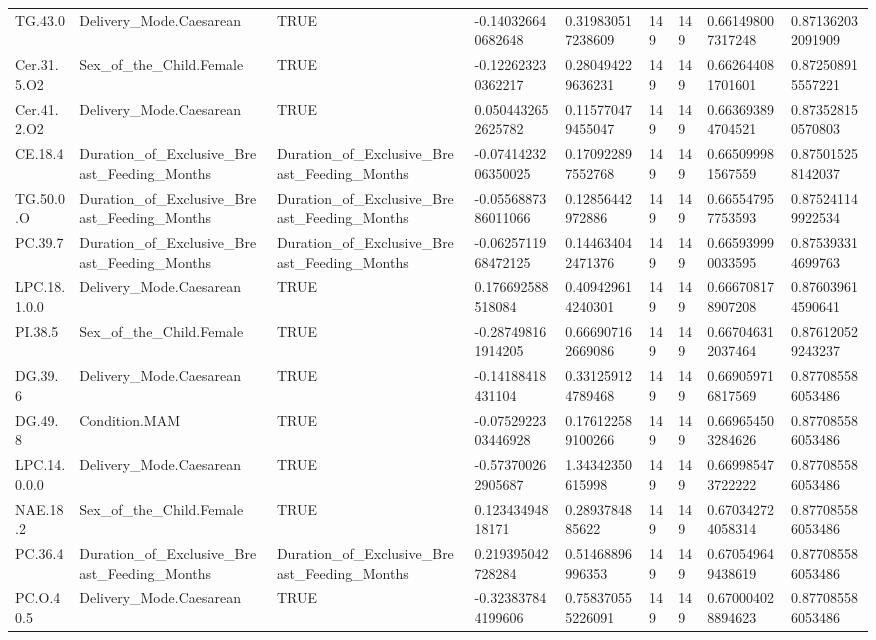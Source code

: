 \begin{longtable}{lllllllll}
TG.43.0 & Delivery\_Mode.Caesarean & TRUE & -0.140326640682648 & 0.319830517238609 & 149 & 149 & 0.661498007317248 & 0.871362032091909 \\
Cer.31.5.O2 & Sex\_of\_the\_Child.Female & TRUE & -0.122623230362217 & 0.280494229636231 & 149 & 149 & 0.662644081701601 & 0.872508915557221 \\
Cer.41.2.O2 & Delivery\_Mode.Caesarean & TRUE & 0.0504432652625782 & 0.115770479455047 & 149 & 149 & 0.663693894704521 & 0.873528150570803 \\
CE.18.4 & Duration\_of\_Exclusive\_Breast\_Feeding\_Months & Duration\_of\_Exclusive\_Breast\_Feeding\_Months & -0.0741423206350025 & 0.170922897552768 & 149 & 149 & 0.665099981567559 & 0.875015258142037 \\
TG.50.0.O & Duration\_of\_Exclusive\_Breast\_Feeding\_Months & Duration\_of\_Exclusive\_Breast\_Feeding\_Months & -0.0556887386011066 & 0.12856442972886 & 149 & 149 & 0.665547957753593 & 0.875241149922534 \\
PC.39.7 & Duration\_of\_Exclusive\_Breast\_Feeding\_Months & Duration\_of\_Exclusive\_Breast\_Feeding\_Months & -0.0625711968472125 & 0.144634042471376 & 149 & 149 & 0.665939990033595 & 0.875393314699763 \\
LPC.18.1.0.0 & Delivery\_Mode.Caesarean & TRUE & 0.176692588518084 & 0.409429614240301 & 149 & 149 & 0.666708178907208 & 0.876039614590641 \\
PI.38.5 & Sex\_of\_the\_Child.Female & TRUE & -0.287498161914205 & 0.666907162669086 & 149 & 149 & 0.667046312037464 & 0.876120529243237 \\
DG.39.6 & Delivery\_Mode.Caesarean & TRUE & -0.14188418431104 & 0.331259124789468 & 149 & 149 & 0.669059716817569 & 0.877085586053486 \\
DG.49.8 & Condition.MAM & TRUE & -0.0752922303446928 & 0.176122589100266 & 149 & 149 & 0.669654503284626 & 0.877085586053486 \\
LPC.14.0.0.0 & Delivery\_Mode.Caesarean & TRUE & -0.573700262905687 & 1.34342350615998 & 149 & 149 & 0.669985473722222 & 0.877085586053486 \\
NAE.18.2 & Sex\_of\_the\_Child.Female & TRUE & 0.12343494818171 & 0.2893784885622 & 149 & 149 & 0.670342724058314 & 0.877085586053486 \\
PC.36.4 & Duration\_of\_Exclusive\_Breast\_Feeding\_Months & Duration\_of\_Exclusive\_Breast\_Feeding\_Months & 0.219395042728284 & 0.51468896996353 & 149 & 149 & 0.670549649438619 & 0.877085586053486 \\
PC.O.40.5 & Delivery\_Mode.Caesarean & TRUE & -0.323837844199606 & 0.758370555226091 & 149 & 149 & 0.670004028894623 & 0.877085586053486 \\

\end{longtable}
